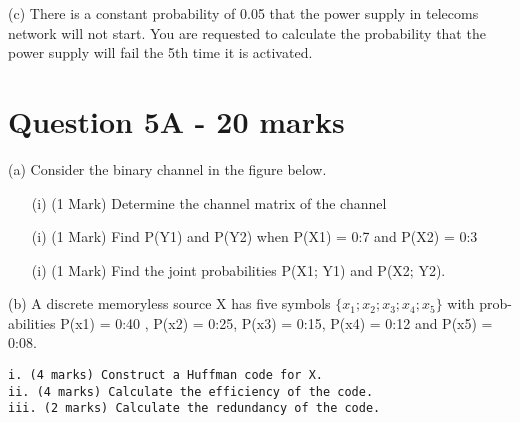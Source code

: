 \documentclass[]{article}
\begin{document}
(c)	There is a constant probability of 0.05  that the power supply in telecoms network will not start.  
You are requested to calculate the probability that the power supply will fail the 5th time it is activated.

\newpage
\section*{Question 5A - 20 marks}
(a) Consider the binary channel in the figure below.

\begin{itemize}
\item[(i)] (1 Mark) Determine the channel matrix of the channel
\item[(i)] (1 Mark)  Find P(Y1) and P(Y2) when P(X1) = 0:7 and P(X2) = 0:3
\item[(i)] (1 Mark)  Find the joint probabilities P(X1; Y1) and P(X2; Y2).
\end{itemize}
(b) A discrete memoryless source X has five symbols $\{x_1; x_2; x_3; x_4; x_5\}$ with prob-
abilities P(x1) = 0:40 , P(x2) = 0:25, P(x3) = 0:15, P(x4) = 0:12 and
P(x5) = 0:08.
\begin{verbatim}
i. (4 marks) Construct a Huffman code for X.
ii. (4 marks) Calculate the efficiency of the code.
iii. (2 marks) Calculate the redundancy of the code.
\end{verbatim}
\end{document}
